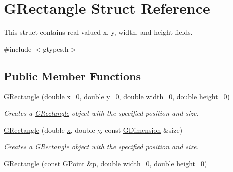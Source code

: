 \hypertarget{structsgl_1_1GRectangle}{}\section{G\+Rectangle Struct Reference}
\label{structsgl_1_1GRectangle}


This struct contains real-\/valued x, y, width, and height fields.  




{\ttfamily \#include $<$gtypes.\+h$>$}

\subsection*{Public Member Functions}
\begin{DoxyCompactItemize}
\item 
\mbox{\hyperlink{structsgl_1_1GRectangle_a3e31a47f01a0e643b572a11b46ce9f69}{G\+Rectangle}} (double \mbox{\hyperlink{structsgl_1_1GRectangle_af88b946fb90d5f08b5fb740c70e98c10}{x}}=0, double \mbox{\hyperlink{structsgl_1_1GRectangle_ab927965981178aa1fba979a37168db2a}{y}}=0, double \mbox{\hyperlink{structsgl_1_1GRectangle_a9df23e056f5d1a0388cd8190431c0e03}{width}}=0, double \mbox{\hyperlink{structsgl_1_1GRectangle_a89f6abd564014faeff7cd20c340a9c7d}{height}}=0)
\begin{DoxyCompactList}\small\item\em Creates a {\ttfamily \mbox{\hyperlink{structsgl_1_1GRectangle}{G\+Rectangle}}} object with the specified position and size. \end{DoxyCompactList}\item 
\mbox{\hyperlink{structsgl_1_1GRectangle_abf6b4d32650748215930e562ffbfb220}{G\+Rectangle}} (double \mbox{\hyperlink{structsgl_1_1GRectangle_af88b946fb90d5f08b5fb740c70e98c10}{x}}, double \mbox{\hyperlink{structsgl_1_1GRectangle_ab927965981178aa1fba979a37168db2a}{y}}, const \mbox{\hyperlink{structsgl_1_1GDimension}{G\+Dimension}} \&size)
\begin{DoxyCompactList}\small\item\em Creates a {\ttfamily \mbox{\hyperlink{structsgl_1_1GRectangle}{G\+Rectangle}}} object with the specified position and size. \end{DoxyCompactList}\item 
\mbox{\hyperlink{structsgl_1_1GRectangle_a68fa0886a48ee516b8897997c767e504}{G\+Rectangle}} (const \mbox{\hyperlink{structsgl_1_1GPoint}{G\+Point}} \&p, double \mbox{\hyperlink{structsgl_1_1GRectangle_a9df23e056f5d1a0388cd8190431c0e03}{width}}=0, double \mbox{\hyperlink{structsgl_1_1GRectangle_a89f6abd564014faeff7cd20c340a9c7d}{height}}=0)

\end{DoxyCompactItemize}
